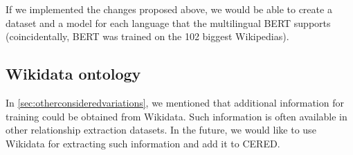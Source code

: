 If we implemented the changes proposed above, we would be able to create a dataset and a model for each language that the multilingual BERT supports (coincidentally, BERT was trained on the 102 biggest Wikipedias).

\subsection{Wikidata ontology}
In \autoref{sec:otherconsideredvariations}, we mentioned that additional information for training could be obtained from Wikidata. Such information is often available in other relationship extraction datasets. In the future, we would like to use Wikidata for extracting such information and add it to CERED.


